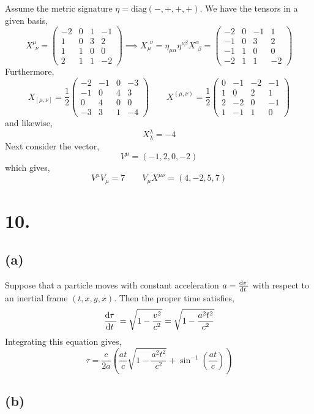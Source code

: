 \documentclass[12pt]{article}
\begin{document}
Assume the metric signature $\eta = \mathrm{diag}(-, +, +, +)$. We have the tensors in a given basis,
\[ 
X^\mu_{\:\: \nu} = 
\begin{pmatrix}
-2 & 0 & 1 & - 1
\\
1 & 0 & 3 & 2 
\\
1 & 1 & 0 & 0
\\
2 & 1 & 1 & -2 
\end{pmatrix}
\implies X_{\mu}^{\:\: \nu} = \eta_{\mu \alpha} \eta^{\nu \beta} X^{\alpha}_{\:\: \beta} = 
\begin{pmatrix}
-2 & 0 & -1 & 1
\\
-1 & 0 & 3 & 2 
\\
-1 & 1 & 0 & 0
\\
-2 & 1 & 1 & -2 
\end{pmatrix}
\]
Furthermore,
\[ X_{[\mu, \nu]} = 
\frac{1}{2} \begin{pmatrix}
-2 & -1 & 0 & -3
\\
-1 & 0 & 4 & 3 
\\
0 & 4 & 0 & 0
\\
-3 & 3 & 1 & -4 
\end{pmatrix}
\quad \quad 
X^{(\mu, \nu)} = 
\frac{1}{2} \begin{pmatrix}
0 & -1 & -2 & -1
\\
1 & 0 & 2 & 1 
\\
2 & -2 & 0 & -1
\\
1 & -1 & 1 & 0 
\end{pmatrix} \]
and likewise,
\[ X^{\lambda}_{\lambda} = -4 \]
Next consider the vector,
\[ V^\mu = (-1, 2, 0, -2) \]
which gives,
\[ V^\mu V_\mu = 7 \quad \quad V_\mu X^{\mu \nu} = (4, -2, 5, 7) \]
\section*{10.}

\subsection*{(a)}

Suppose that a particle moves with constant acceleration $a = \frac{\mathrm{d}v \:}{\mathrm{d}t \:}$ with respect to an inertial frame $(t, x, y, x)$. Then the proper time satisfies,
\[ \frac{\mathrm{d}\tau \:}{\mathrm{d}t \:} = \sqrt{1 - \frac{v^2}{c^2}} = \sqrt{1 - \frac{a^2 t^2}{c^2}} \]
Integrating this equation gives,
\[ \tau = \frac{c}{2a} \left( \frac{at}{c} \sqrt{1 - \frac{a^2 t^2}{c^2}} +  \sin^{-1}{\left( \frac{at}{c} \right)} \right) \] 

\subsection*{(b)}
\end{document}
